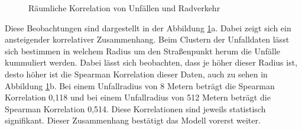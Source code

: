 \documentclass[a4paper,12pt]{thesis}
\begin{document}
\begin{figure}%
	\centering
	\qquad
	\caption{Räumliche Korrelation von Unfällen und Radverkehr}%
	\label{fig:UnfallKorrelatoon}%
\end{figure}

Diese Beobachtungen sind dargestellt in der Abbildung \ref{fig:UnfallKorrelatoon}a. Dabei zeigt sich ein ansteigender korrelativer Zusammenhang. Beim Clustern der Unfalldaten lässt sich bestimmen in welchem Radius um den Straßenpunkt herum die Unfälle kummuliert werden. Dabei lässt sich beobachten, dass je höher dieser Radius ist, desto höher ist die Spearman Korrelation dieser Daten, auch zu sehen in Abbildung \ref{fig:UnfallKorrelatoon}b. Bei einem Unfallradius von 8 Metern beträgt die Spearman Korrelation 0,118 und bei einem Unfallradius von 512 Metern beträgt die Spearman Korrelation 0,514. Diese Korrelationen sind jeweils statistisch signifikant. Dieser Zusammenhang bestätigt das Modell vorerst weiter.\\
\end{document}
